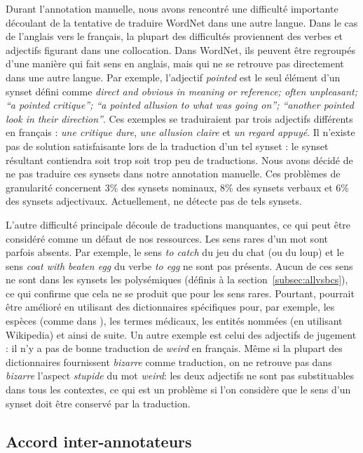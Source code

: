 Durant l'annotation manuelle, nous avons rencontré une difficulté importante découlant de la tentative de traduire WordNet dans une autre langue. Dans le cas de l'anglais vers le français, la plupart des difficultés proviennent des verbes et adjectifs figurant dans une collocation. Dans WordNet, ils peuvent être regroupés d'une manière qui fait sens en anglais, mais qui ne se retrouve pas directement dans une autre langue. Par exemple, l'adjectif \textit{pointed} est le seul élément d'un synset défini comme \textit{direct and obvious in meaning or reference; often unpleasant; ``a pointed critique''; ``a pointed allusion to what was going on''; ``another pointed look in their direction''}. Ces exemples se traduiraient par trois adjectifs différents en français : \textit{une critique dure}, \textit{une allusion claire} et \textit{un regard appuyé}. Il n'existe pas de solution satisfaisante lors de la traduction d'un tel synset : le synset résultant contiendra soit trop soit trop peu de traductions. Nous avons décidé de ne pas traduire ces synsets dans notre annotation manuelle. Ces problèmes de granularité concernent 3\% des synsets nominaux, 8\% des synsets verbaux et 6\% des synsets adjectivaux. Actuellement, \newjaws{} ne détecte pas de tels synsets. 

L'autre difficulté principale découle de traductions manquantes, ce qui peut être considéré comme un défaut de nos ressources. Les sens rares d'un mot sont parfois absents. Par exemple, le sens \textit{to catch} du jeu du chat (ou du loup) et le sens \textit{coat with beaten egg} du verbe \textit{to egg} ne sont pas présents. Aucun de ces sens ne sont dans les synsets les polysémiques (définis à la section~\ref{subsec:allvsbcs}), ce qui confirme que cela ne se produit que pour les sens rares. Pourtant, \newjaws{} pourrait être amélioré en utilisant des dictionnaires spécifiques pour, par exemple, les espèces (comme dans \cite{sagot2008construction}), les termes médicaux, les entités nommées (en utilisant Wikipedia) et ainsi de suite. Un autre exemple est celui des adjectifs de jugement : il n'y a pas de bonne traduction de \textit{weird} en français. Même si la plupart des dictionnaires fournissent \textit{bizarre} comme traduction, on ne retrouve pas dans \textit{bizarre} l'aspect \textit{stupide} du mot \textit{weird}: les deux adjectifs ne sont pas substituables dans tous les contextes, ce qui est un problème si l'on considère que le sens d'un synset doit être conservé par la traduction.

\subsection{Accord inter-annotateurs}
\label{subsec:interannotator_agreement}

